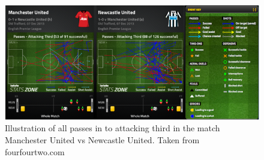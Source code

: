 \begin{figure}[ht!]
\centering
\includegraphics[width=1\textwidth]{images/general/fourfourtwo.png}
\caption{Illustration of all passes in to attacking third in the match Manchester United vs Newcastle United. Taken from fourfourtwo.com}
\label{fig:fourfourtwo}
\end{figure}



